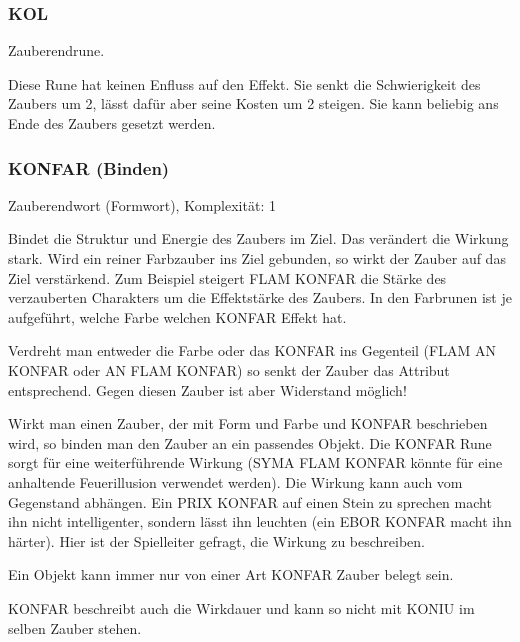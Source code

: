 \documentclass{article}
\begin{document}
\subsubsection{KOL}

Zauberendrune.

Diese Rune hat keinen Enfluss auf den Effekt. Sie senkt die Schwierigkeit des Zaubers um 2, lässt dafür aber seine
Kosten um 2 steigen. Sie kann beliebig ans Ende des Zaubers gesetzt werden.

\subsubsection{KONFAR (Binden)}

Zauberendwort (Formwort), Komplexität: 1

Bindet die Struktur und Energie des Zaubers im Ziel. Das verändert die Wirkung stark. Wird ein reiner Farbzauber ins
Ziel gebunden, so wirkt der Zauber auf das Ziel verstärkend. Zum Beispiel steigert FLAM KONFAR die Stärke des
verzauberten Charakters um die Effektstärke des Zaubers. In den Farbrunen ist je aufgeführt, welche Farbe welchen
KONFAR Effekt hat.

Verdreht man entweder die Farbe oder das KONFAR ins Gegenteil (FLAM AN KONFAR oder AN FLAM KONFAR) so senkt der Zauber
das Attribut entsprechend. Gegen diesen Zauber ist aber Widerstand möglich!

Wirkt man einen Zauber, der mit Form und Farbe und KONFAR beschrieben wird, so binden man den Zauber an ein passendes
Objekt. Die KONFAR Rune sorgt für eine weiterführende Wirkung (SYMA FLAM KONFAR könnte für eine anhaltende
Feuerillusion verwendet werden). Die Wirkung kann auch vom Gegenstand abhängen. Ein PRIX KONFAR auf einen Stein zu
sprechen macht ihn nicht intelligenter, sondern lässt ihn leuchten (ein EBOR KONFAR macht ihn härter). Hier ist der
Spielleiter gefragt, die Wirkung zu beschreiben.

Ein Objekt kann immer nur von einer Art KONFAR Zauber belegt sein.

KONFAR beschreibt auch die Wirkdauer und kann so nicht mit KONIU im selben Zauber stehen.
\end{document}
